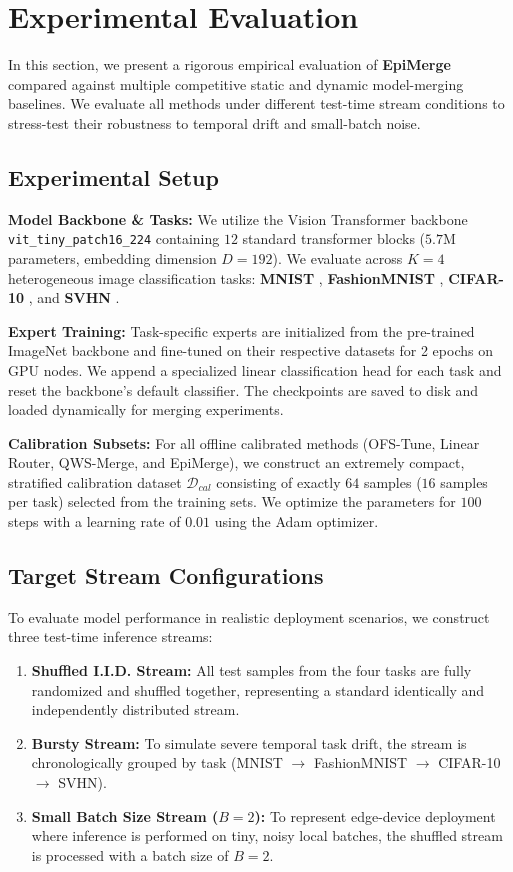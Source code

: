 \section{Experimental Evaluation}
\label{sec:experiments}

In this section, we present a rigorous empirical evaluation of \textbf{EpiMerge} compared against multiple competitive static and dynamic model-merging baselines. We evaluate all methods under different test-time stream conditions to stress-test their robustness to temporal drift and small-batch noise.

\subsection{Experimental Setup}

\textbf{Model Backbone \& Tasks:} We utilize the Vision Transformer backbone \texttt{vit\_tiny\_patch16\_224} \cite{vit} containing $12$ standard transformer blocks ($5.7$M parameters, embedding dimension $D=192$). We evaluate across $K=4$ heterogeneous image classification tasks: \textbf{MNIST} \cite{mnist}, \textbf{FashionMNIST} \cite{fashionmnist}, \textbf{CIFAR-10} \cite{cifar10}, and \textbf{SVHN} \cite{svhn}.

\textbf{Expert Training:} Task-specific experts are initialized from the pre-trained ImageNet backbone and fine-tuned on their respective datasets for 2 epochs on GPU nodes. We append a specialized linear classification head for each task and reset the backbone's default classifier. The checkpoints are saved to disk and loaded dynamically for merging experiments.

\textbf{Calibration Subsets:} For all offline calibrated methods (OFS-Tune, Linear Router, QWS-Merge, and EpiMerge), we construct an extremely compact, stratified calibration dataset $\mathcal{D}_{cal}$ consisting of exactly $64$ samples ($16$ samples per task) selected from the training sets. We optimize the parameters for $100$ steps with a learning rate of $0.01$ using the Adam optimizer.

\subsection{Target Stream Configurations}
To evaluate model performance in realistic deployment scenarios, we construct three test-time inference streams:
\begin{enumerate}
    \item \textbf{Shuffled I.I.D. Stream:} All test samples from the four tasks are fully randomized and shuffled together, representing a standard identically and independently distributed stream.
    \item \textbf{Bursty Stream:} To simulate severe temporal task drift, the stream is chronologically grouped by task (MNIST $\rightarrow$ FashionMNIST $\rightarrow$ CIFAR-10 $\rightarrow$ SVHN). 
    \item \textbf{Small Batch Size Stream ($B=2$):} To represent edge-device deployment where inference is performed on tiny, noisy local batches, the shuffled stream is processed with a batch size of $B=2$.
\end{enumerate}

